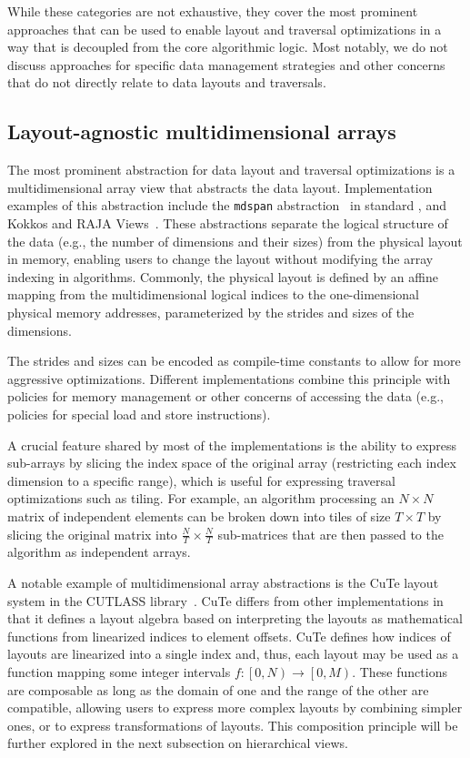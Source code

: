 While these categories are not exhaustive, they cover the most prominent approaches that can be used to enable layout and traversal optimizations in a way that is decoupled from the core algorithmic logic. Most notably, we do not discuss approaches for specific data management strategies and other concerns that do not directly relate to data layouts and traversals.


\subsection{Layout-agnostic multidimensional arrays}\label{sec:layout-agnostic-multidim-arrays}

The most prominent abstraction for data layout and traversal optimizations is a multidimensional array view that abstracts the data layout. Implementation examples of this abstraction include the \texttt{mdspan} abstraction~\cite{trott2022mdspan} in standard \cpp, and Kokkos and RAJA Views~\cite{trott2021kokkos,beckingsale2019raja}. These abstractions separate the logical structure of the data (e.g., the number of dimensions and their sizes) from the physical layout in memory, enabling users to change the layout without modifying the array indexing in algorithms. Commonly, the physical layout is defined by an affine mapping from the multidimensional logical indices to the one-dimensional physical memory addresses, parameterized by the strides and sizes of the dimensions.

The strides and sizes can be encoded as compile-time constants to allow for more aggressive optimizations. Different implementations combine this principle with policies for memory management or other concerns of accessing the data (e.g., policies for special load and store instructions).

A crucial feature shared by most of the implementations is the ability to express sub-arrays by slicing the index space of the original array (restricting each index dimension to a specific range), which is useful for expressing traversal optimizations such as tiling. For example, an algorithm processing an $N \times N$ matrix of independent elements can be broken down into tiles of size $T \times T$ by slicing the original matrix into $\frac{N}{T} \times \frac{N}{T}$ sub-matrices that are then passed to the algorithm as independent arrays.

A notable example of multidimensional array abstractions is the CuTe layout system in the CUTLASS library~\cite{thakkar2023cutlass}. CuTe differs from other implementations in that it defines a layout algebra based on interpreting the layouts as mathematical functions from linearized indices to element offsets. CuTe defines how indices of layouts are linearized into a single index and, thus, each layout may be used as a function mapping some integer intervals $f: \left[0, N\right) \to \left[0, M\right)$. These functions are composable as long as the domain of one and the range of the other are compatible, allowing users to express more complex layouts by combining simpler ones, or to express transformations of layouts. This composition principle will be further explored in the next subsection on hierarchical views.


